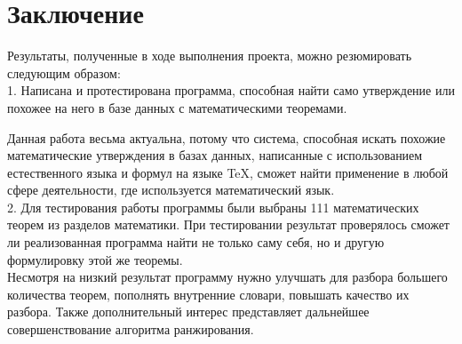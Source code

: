 \documentclass[12pt]{article}
\begin{document}
\newpage
\section*{Заключение}
Результаты, полученные в ходе выполнения проекта, можно резюмировать следующим образом: \\

1. Написана и протестирована программа, способная найти само утверждение или похожее на него в базе данных с математическими теоремами.\vskip 0.3cm

Данная работа весьма актуальна, потому что система, способная искать похожие математические утверждения в базах данных, написанные с использованием естественного языка и формул на языке TeX, сможет найти применение в любой сфере деятельности, где используется математический язык.  \\

2. Для тестирования работы программы были выбраны 111 математических теорем из разделов математики. При тестировании результат проверялось сможет ли реализованная программа найти не только саму себя, но и другую формулировку этой же теоремы. \\

Несмотря на низкий результат программу нужно улучшать для разбора большего количества теорем, пополнять внутренние словари, повышать качество их разбора. Также дополнительный интерес представляет дальнейшее совершенствование алгоритма ранжирования.
\end{document}

